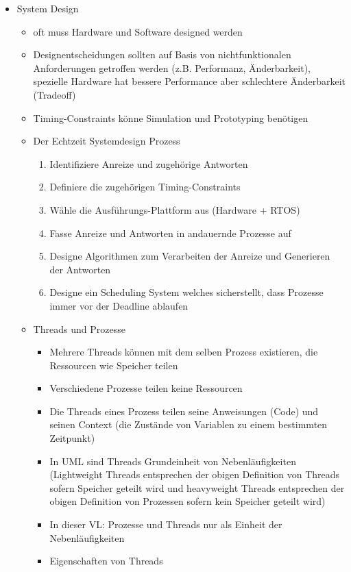 \documentclass[paper=a4, fontsize=11pt]{scrartcl} %
\numberwithin{equation}{section} %
\numberwithin{figure}{section} %
\numberwithin{table}{section} %
\begin{document}
\begin{itemize}
\begin{itemize}
  \end{itemize}
  \item System Design
  \begin{itemize}
    \item oft muss Hardware und Software designed werden
    \item Designentscheidungen sollten auf Basis von nichtfunktionalen Anforderungen getroffen werden (z.B. Performanz, Änderbarkeit), spezielle Hardware hat bessere Performance aber schlechtere Änderbarkeit (Tradeoff)
    \item Timing-Constraints könne Simulation und Prototyping benötigen
    \item Der Echtzeit Systemdesign Prozess
    \begin{enumerate}
      \item Identifiziere Anreize und zugehörige Antworten
      \item Definiere die zugehörigen Timing-Constraints
      \item Wähle die Ausführungs-Plattform aus (Hardware + RTOS)
      \item Fasse Anreize und Antworten in andauernde Prozesse auf
      \item Designe Algorithmen zum Verarbeiten der Anreize und Generieren der Antworten
      \item Designe ein Scheduling System welches sicherstellt, dass Prozesse immer vor der Deadline ablaufen
    \end{enumerate}
    \item Threads und Prozesse
    \begin{itemize}
      \item Mehrere Threads können mit dem selben Prozess existieren, die Ressourcen wie Speicher teilen
      \item Verschiedene Prozesse teilen keine Ressourcen
      \item Die Threads eines Prozess teilen seine Anweisungen (Code) und seinen Context (die Zustände von Variablen zu einem bestimmten Zeitpunkt)
      \item In UML sind Threads Grundeinheit von Nebenläufigkeiten (Lightweight Threads entsprechen der obigen Definition von Threads sofern Speicher geteilt wird und heavyweight Threads entsprechen der obigen Definition von Prozessen sofern kein Speicher geteilt wird)
      \item In dieser VL: Prozesse und Threads nur als Einheit der Nebenläufigkeiten
      \item Eigenschaften von Threads

\end{itemize}
\end{itemize}
\end{itemize}
\end{document}
